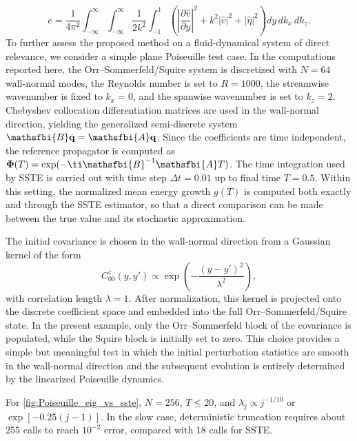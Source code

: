\begin{equation}
  e
  =
  \frac{1}{4\pi^2}
  \int_{-\infty}^{\infty}
  \int_{-\infty}^{\infty}
  \frac{1}{2k^2}
  \int_{-1}^{1}
  \left(
    \left|\frac{\partial \hat{v}}{\partial y}\right|^2
    +
    k^2 |\hat{v}|^2
    +
    |\hat{\eta}|^2
  \right)
  dy\, dk_x\, dk_z.
\end{equation}
To further assess the proposed method on a fluid-dynamical system of direct relevance, we consider a simple plane Poiseuille test case. In the computations reported here, the Orr--Sommerfeld/Squire system is discretized with \(N=64\) wall-normal modes, the Reynolds number is set to \(R=1000\), the streamwise wavenumber is fixed to \(k_x=0\), and the spanwise wavenumber is set to \(k_z=2\). Chebyshev collocation differentiation matrices are used in the wall-normal direction, yielding the generalized semi-discrete system \(\mathsfbi{B}\dot{\mathbf{q}}=\mathsfbi{A}\mathbf{q}\). Since the coefficients are time independent, the reference propagator is computed as \(\boldsymbol{\Phi}(T)=\exp(-\ii\mathsfbi{B}^{-1}\mathsfbi{A}T)\). The time integration used by SSTE is carried out with time step \(\Delta t=0.01\) up to final time \(T=0.5\). Within this setting, the normalized mean energy growth \(g(T)\) is computed both exactly and through the SSTE estimator, so that a direct comparison can be made between the true value and its stochastic approximation.

The initial covariance is chosen in the wall-normal direction from a Gaussian kernel of the form
\begin{equation}
  C_{00}^{z}(y,y')
  \propto
  \exp\!\left(
    -\frac{(y-y')^2}{\lambda^2}
  \right),
\end{equation}
with correlation length \(\lambda=1\). After normalization, this kernel is projected onto the discrete coefficient space and embedded into the full Orr--Sommerfeld/Squire state. In the present example, only the Orr--Sommerfeld block of the covariance is populated, while the Squire block is initially set to zero. This choice provides a simple but meaningful test in which the initial perturbation statistics are smooth in the wall-normal direction and the subsequent evolution is entirely determined by the linearized Poiseuille dynamics.

For \cref{fig:Poiseuille_eig_vs_sste}, \(N=256\), \(T\leq20\), and \(\lambda_j\propto j^{-1/10}\) or \(\exp[-0.25(j-1)]\). In the slow case, deterministic truncation requires about 255 calls to reach \(10^{-2}\) error, compared with 18 calls for SSTE.
